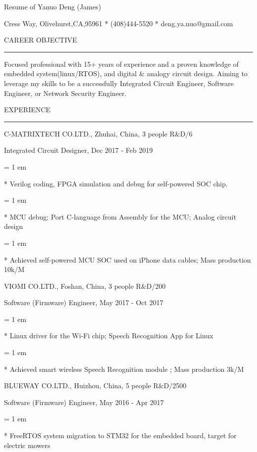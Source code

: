 

\centerline{ \FFaa
Resume of Yanuo Deng (James)
}

\centerline{  Cress Way, Olivehurst,CA,95961
*
(408)444-5520
*
deng.ya.nuo@gmail.com
}

{ \medbreak } { \FFcc
CAREER OBJECTIVE
}

{ \smallbreak } {\par\noindent\hrule} { \smallbreak }

    Focused professional with 15+ years of experience
and a proven knowledge of embedded system(linux/RTOS),
and digital \& analogy circuit design.
    Aiming to leverage my skills to be a successfully
Integrated Circuit Engineer,
Software Engineer,
or Network Security Engineer.

{ \medbreak } { \FFcc
EXPERIENCE
}
{ \smallbreak } {\par\noindent\hrule} { \smallbreak }

{ \medbreak } { \FFdd
C-MATRIXTECH CO.LTD., Zhuhai, China, 3 people R\&D/6
}

{ \FFee
Integrated Circuit Designer, Dec 2017 - Feb 2019
}

{ \parindent = 1 em \item{*}
 Verilog coding, FPGA simulation and debug for self-powered SOC chip.
}

{ \parindent = 1 em \item{*}
 MCU debug; Port C-language from Assembly for the MCU; Analog circuit design
}
{ \parindent = 1 em \item{*}
 Achieved self-powered MCU SOC used on iPhone data cables; Mass production 10k/M
}

{ \medbreak } { \FFdd
VIOMI CO.LTD., Foshan, China, 3 people R\&D/200
}

{ \FFee
Software (Firmware) Engineer, May 2017 - Oct 2017
}

{ \parindent = 1 em \item{*}
 Linux driver for the Wi-Fi chip; Speech Recognition App for Linux
 }
{ \parindent = 1 em \item{*}
 Achieved smart wireless Speech Recognition module ; Mass production 3k/M
 }

{ \medbreak } { \FFdd
BLUEWAY CO.LTD., Huizhou, China, 5 people R\&D/2500
}

{ \FFee
Software (Firmware) Engineer, May 2016 - Apr 2017
}
{ \parindent = 1 em \item{*}
 FreeRTOS system migration to STM32 for the embedded board, target for electric mowers
 }

